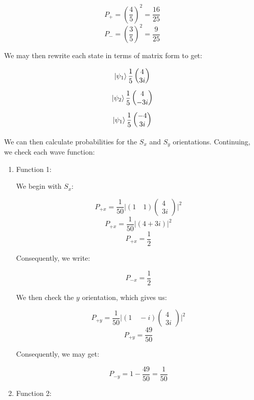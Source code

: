 \begin{enumerate}
\begin{enumerate}
        $$\boxed{P_+=\left( \frac{4}{5} \right)^2=\frac{16}{25}}$$
        $$\boxed{P_-=\left( \frac{3}{5} \right)^2=\frac{9}{25}}$$

        We may then rewrite each state in terms of matrix form to get:

        $$\ket{\psi_1}\frac{1}{5}\left( \begin{matrix} 4\\3i \end{matrix} \right)$$
        $$\ket{\psi_2}\frac{1}{5}\left( \begin{matrix} 4\\-3i \end{matrix} \right)$$
        $$\ket{\psi_1}\frac{1}{5}\left( \begin{matrix} -4\\3i \end{matrix} \right)$$

        We can then calculate probabilities for the $S_x$ and $S_y$ orientations. Continuing, we check each wave function:

        \begin{enumerate}

          \item Function 1:

            We begin with $S_x$:

            $$P_{+x}=\frac{1}{50}\Big| (1\quad1)\left( \begin{matrix} 4\\3i \end{matrix} \right)\Big|^2$$
            $$P_{+x}=\frac{1}{50}\Big| (4+3i)\Big|^2$$
            $$\boxed{P_{+x}=\frac{1}{2}}$$

            Consequently, we write:

            $$\boxed{P_{-x}=\frac{1}{2}}$$

            We then check the $y$ orientation, which gives us:

            $$P_{+y}=\frac{1}{50}\Big| (1\quad -i)\left( \begin{matrix} 4\\3i \end{matrix} \right)\Big|^2$$
            $$\boxed{P_{+y}=\frac{49}{50}}$$

            Consequently, we may get:

            $$\boxed{P_{-y}=1-\frac{49}{50}=\frac{1}{50}}$$

          \item Function 2:


\end{enumerate}
\end{enumerate}
\end{enumerate}
